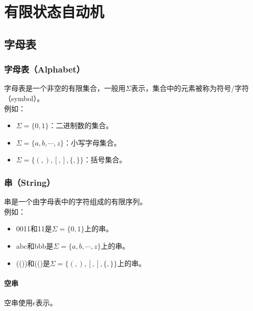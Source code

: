 \chapter{有限状态自动机}

\section{字母表}

\subsection{字母表（Alphabet）}

字母表是一个非空的有限集合，一般用$ \Sigma $表示，集合中的元素被称为符号/字符（symbol）。\\

例如：

\begin{itemize}
	\item $ \Sigma = \{0, 1\} $：二进制数的集合。
	\item $ \Sigma = \{a, b, \cdots, z\} $：小写字母集合。
	\item $ \Sigma = \{(, ), [, ], \{, \}\} $：括号集合。
\end{itemize}

\vspace{0.5cm}

\subsection{串（String）}

串是一个由字母表中的字符组成的有限序列。\\

例如：

\begin{itemize}
	\item 0011和11是$ \Sigma = \{0, 1\} $上的串。
	\item abc和bbb是$ \Sigma = \{a, b, \cdots, z\} $上的串。
	\item (())和(()是$ \Sigma = \{(, ), [, ], \{, \}\} $上的串。
\end{itemize}

\vspace{0.5cm}

\subsubsection{空串}

空串使用$ \epsilon $表示。\\

